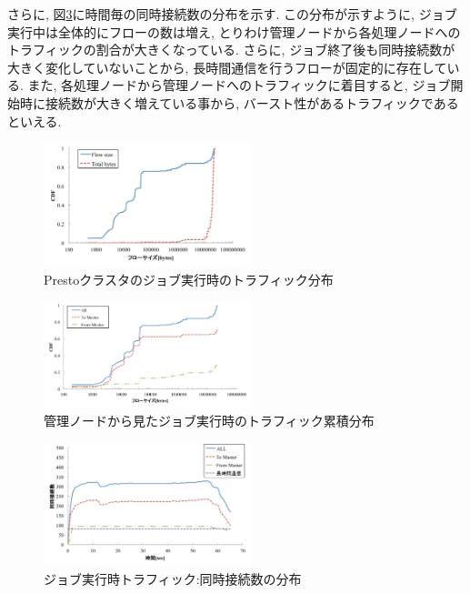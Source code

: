 \documentclass[11pt, a4paper, uplatex]{jsarticle}
\begin{document}
さらに, 図\ref{fig:job_conc}に時間毎の同時接続数の分布を示す.
この分布が示すように, ジョブ実行中は全体的にフローの数は増え, とりわけ管理ノードから各処理ノードへのトラフィックの割合が大きくなっている.
さらに, ジョブ終了後も同時接続数が大きく変化していないことから, 長時間通信を行うフローが固定的に存在している.
また, 各処理ノードから管理ノードへのトラフィックに着目すると, ジョブ開始時に接続数が大きく増えている事から, バースト性があるトラフィックであるといえる.

\begin{figure}[t]
    \begin{center}
    \includegraphics[autoebb, width=170pt]{./img/job.pdf}
    \caption{Prestoクラスタのジョブ実行時のトラフィック分布}
    \label{fig:job}
    \end{center}
\end{figure}

\begin{figure}[t]
    \begin{center}
    \includegraphics[autoebb, width=170pt]{./img/job_cdf.pdf}
    \caption{管理ノードから見たジョブ実行時のトラフィック累積分布}
    \label{fig:job_cdf}
    \end{center}
\end{figure}

\begin{figure}[t]
    \begin{center}
    \includegraphics[autoebb, width=170pt]{./img/job_conc.pdf}
    \caption{ジョブ実行時トラフィック:同時接続数の分布}
    \label{fig:job_conc}
    \end{center}
\end{figure}
\end{document}
